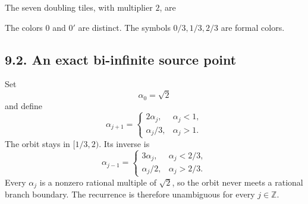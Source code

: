 \documentclass[11pt]{article}
\begin{document}
\begin{center}
\end{center}

The seven doubling tiles, with multiplier \(2\), are

\begin{center}
\end{center}

The colors \(0\) and \(0'\) are distinct. The symbols \(0/3,1/3,2/3\)
are formal colors.

\subsection*{9.2. An exact bi-infinite source point}

Set
\[
  \alpha_0=\sqrt2
\]
and define
\[
\alpha_{j+1}=
\begin{cases}
2\alpha_j,&\alpha_j<1,\\
\alpha_j/3,&\alpha_j>1.
\end{cases}
\]
The orbit stays in \([1/3,2)\). Its inverse is
\[
\alpha_{j-1}=
\begin{cases}
3\alpha_j,&\alpha_j<2/3,\\
\alpha_j/2,&\alpha_j>2/3.
\end{cases}
\]
Every \(\alpha_j\) is a nonzero rational multiple of \(\sqrt2\), so the orbit
never meets a rational branch boundary. The recurrence is therefore
unambiguous for every \(j\in\mathbb Z\).
\end{document}
